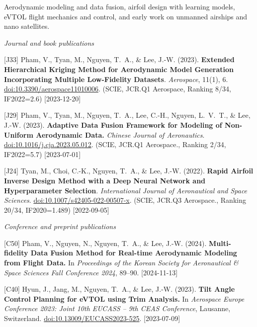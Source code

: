 {\begin{pubenumerate}
\end{pubenumerate}



Aerodynamic modeling and data fusion, airfoil design with learning models, eVTOL flight mechanics and control, and early work on unmanned airships and nano satellites.

\textit{Journal and book publications}
\begin{pubenumerate}
\item {\color{blue}[J33]} Pham, V., Tyan, M., Nguyen, T.\ A., \& Lee, J.-W. (2023). \textbf{Extended Hierarchical Kriging Method for Aerodynamic Model Generation Incorporating Multiple Low-Fidelity Datasets}. \textit{Aerospace}, 11(1), 6. \href{https://doi.org/10.3390/aerospace11010006}{doi:10.3390/aerospace11010006}. (SCIE, JCR.Q1 Aerospace, Ranking 8/34, IF2022=2.6)
\hfill [2023-12-20]

\item {\color{blue}[J29]} Pham, V., Tyan, M., Nguyen, T.\ A., Lee, C.-H., Nguyen, L.\ V.\ T., \& Lee, J.-W. (2023). \textbf{Adaptive Data Fusion Framework for Modeling of Non-Uniform Aerodynamic Data.} \textit{Chinese Journal of Aeronautics}. \href{https://doi.org/10.1016/j.cja.2023.05.012}{doi:10.1016/j.cja.2023.05.012}. (SCIE, JCR.Q1 Aerospace., Ranking 2/34, IF2022=5.7) [2023-07-01]

\item {\color{blue}[J24]} Tyan, M., Choi, C.-K., Nguyen, T.\ A., \& Lee, J.-W. (2022). \textbf{Rapid Airfoil Inverse Design Method with a Deep Neural Network and Hyperparameter Selection}. \textit{International Journal of Aeronautical and Space Sciences}. \href{https://doi.org/10.1007/s42405-022-00507-x}{doi:10.1007/s42405-022-00507-x}. (SCIE, JCR.Q3 Aerospace., Ranking 20/34, IF2020=1.489) [2022-09-05]

\end{pubenumerate}

\textit{Conference and preprint publications}
\begin{pubenumerate}
\item {\color{green}[C50]} Pham, V., Nguyen, N., Nguyen, T.\ A., \& Lee, J.-W. (2024). 
  \textbf{Multi-fidelity Data Fusion Method for Real-time Aerodynamic Modeling from Flight Data.} 
  In \textit{Proceedings of the Korean Society for Aeronautical \& Space Sciences Fall Conference 2024}, 89--90. [2024-11-13]

\item {\color{green}[C40]} Hyun, J., Jang, M., Nguyen, T.\ A., \& Lee, J.-W. (2023). 
  \textbf{Tilt Angle Control Planning for eVTOL using Trim Analysis.} 
  In \textit{Aerospace Europe Conference 2023: Joint 10th EUCASS -- 9th CEAS Conference}, Lausanne, Switzerland. 
  \href{https://doi.org/10.13009/EUCASS2023-525}{doi:10.13009/EUCASS2023-525}. [2023-07-09]


\end{pubenumerate}}
